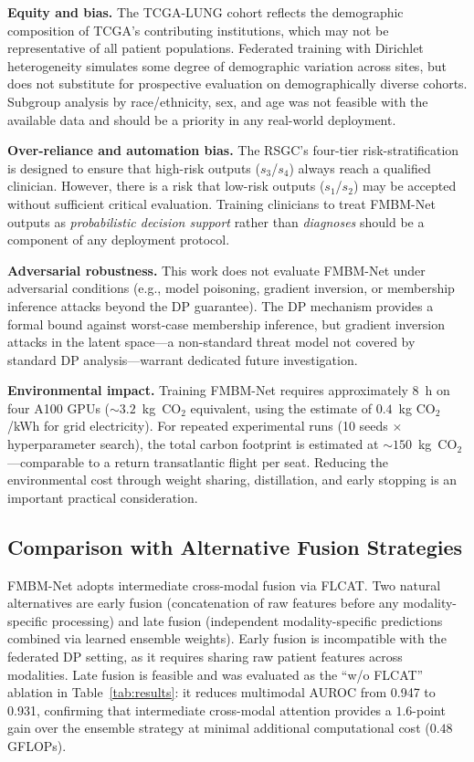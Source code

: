 \documentclass[a4paper,fleqn]{cas-dc}
\begin{document}
\textbf{Equity and bias.}
The TCGA-LUNG cohort reflects the demographic composition of TCGA's
contributing institutions, which may not be representative of all patient
populations. Federated training with Dirichlet heterogeneity simulates
some degree of demographic variation across sites, but does not substitute
for prospective evaluation on demographically diverse cohorts. Subgroup
analysis by race/ethnicity, sex, and age was not feasible with the available
data and should be a priority in any real-world deployment.

\textbf{Over-reliance and automation bias.}
The RSGC's four-tier risk-stratification is designed to ensure that
high-risk outputs ($s_3$/$s_4$) always reach a qualified clinician.
However, there is a risk that low-risk outputs ($s_1$/$s_2$) may be accepted
without sufficient critical evaluation. Training clinicians to treat FMBM-Net
outputs as \emph{probabilistic decision support} rather than \emph{diagnoses}
should be a component of any deployment protocol.

\textbf{Adversarial robustness.}
This work does not evaluate FMBM-Net under adversarial conditions
(e.g., model poisoning, gradient inversion, or membership inference attacks
beyond the DP guarantee). The DP mechanism provides a formal bound against
worst-case membership inference, but gradient inversion attacks in the latent
space---a non-standard threat model not covered by standard DP
analysis---warrant dedicated future investigation.

\textbf{Environmental impact.}
Training FMBM-Net requires approximately $8$~h on four A100 GPUs
($\sim\!3.2$~kg~CO$_2$ equivalent, using the estimate of
$0.4$~kg CO$_2$/kWh for grid electricity). For repeated experimental runs
(10 seeds $\times$ hyperparameter search), the total carbon footprint is
estimated at $\sim\!150$~kg~CO$_2$---comparable to a return transatlantic
flight per seat. Reducing the environmental cost through weight sharing,
distillation, and early stopping is an important practical consideration.

\subsection{Comparison with Alternative Fusion Strategies}

FMBM-Net adopts intermediate cross-modal fusion via FLCAT. Two natural
alternatives are early fusion (concatenation of raw features before any
modality-specific processing) and late fusion (independent modality-specific
predictions combined via learned ensemble weights). Early fusion is
incompatible with the federated DP setting, as it requires sharing raw
patient features across modalities. Late fusion is feasible and was evaluated
as the ``w/o FLCAT'' ablation in Table~\ref{tab:results}: it reduces
multimodal AUROC from 0.947 to 0.931, confirming that intermediate
cross-modal attention provides a $1.6$-point gain over the ensemble strategy
at minimal additional computational cost ($0.48$ GFLOPs).
\end{document}
